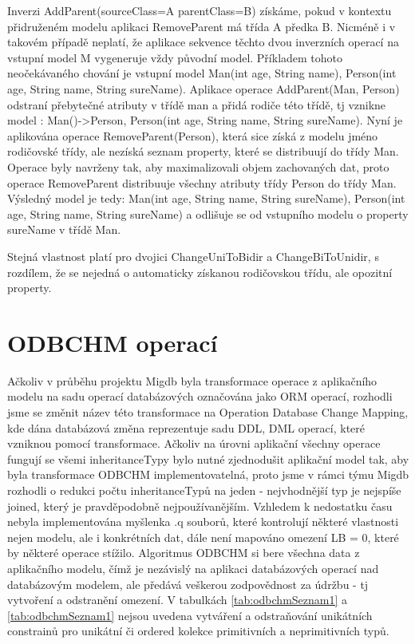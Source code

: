 \documentclass[11pt,twoside,a4paper]{book}
\begin{document}
Inverzi AddParent(sourceClass=A parentClass=B) získáme, pokud v
kontextu přidruženém modelu aplikaci RemoveParent má třída A předka B. Nicméně i
v takovém případě neplatí, že aplikace sekvence těchto dvou inverzních operací
na vstupní model M vygeneruje vždy původní model. Příkladem tohoto neočekávaného
chování je vstupní model Man(int age, String name), Person(int age, String name, String sureName).
Aplikace operace AddParent(Man, Person) odstraní přebytečné atributy v třídě man
a přidá rodiče této třídě, tj vznikne model : Man()->Person, Person(int age,
String name, String sureName). Nyní je aplikována operace RemoveParent(Person),
která sice získá z modelu jméno rodičovské třídy, ale nezíská seznam property,
které se distribuují do třídy Man. Operace byly navrženy tak, aby maximalizovali
objem zachovaných dat, proto operace RemoveParent distribuuje všechny
atributy třídy Person do třídy Man. Výsledný model je tedy: Man(int age, String
name, String sureName), Person(int age, String name, String sureName) a odlišuje
se od vstupního modelu o property sureName v třídě Man.

Stejná vlastnost platí pro dvojici ChangeUniToBidir a ChangeBiToUnidir, s
rozdílem, že se nejedná o automaticky získanou rodičovskou třídu, ale
opozitní property.

\section{ODBCHM operací}

Ačkoliv v průběhu projektu Migdb byla transformace operace z aplikačního modelu
na sadu operací databázových označována jako ORM operací, rozhodli jsme se
změnit název této transformace na Operation Database Change Mapping, kde dána
databázová změna reprezentuje sadu DDL, DML operací, které vzniknou pomocí
transformace. Ačkoliv na úrovni aplikační všechny operace fungují se všemi inheritanceTypy 
bylo nutné zjednodušit aplikační model tak, aby byla transformace ODBCHM implementovatelná, 
proto jsme v rámci týmu Migdb rozhodli o redukci počtu inheritanceTypů na jeden - nejvhodnější
typ je nejspíše joined, který je pravděpodobně nejpoužívanějším. Vzhledem k nedostatku času nebyla implementována myšlenka .q 
souborů, které kontrolují některé vlastnosti nejen modelu, ale i konkrétních dat, dále není mapováno omezení LB = 0, 
které by některé operace stížilo. Algoritmus ODBCHM si bere všechna data z aplikačního modelu, čímž je nezávislý na aplikaci 
databázových operací nad databázovým modelem, ale předává veškerou zodpovědnost za údržbu - tj vytvoření a odstranění omezení.
V tabulkách \ref{tab:odbchmSeznam1} a \ref{tab:odbchmSeznam1} nejsou uvedena vytváření a 
odstraňování unikátních constrainů pro unikátní či ordered kolekce primitivních a neprimitivních typů. 
\end{document}

